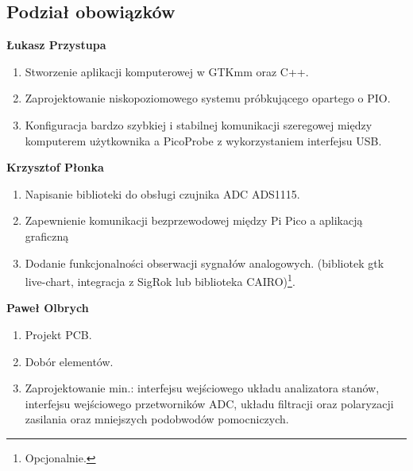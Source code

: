 \subsection{Podział obowiązków}
    \textbf{Łukasz Przystupa}
    \begin{enumerate}
        \item Stworzenie aplikacji komputerowej w GTKmm oraz C++.
        \item Zaprojektowanie niskopoziomowego systemu próbkującego opartego o PIO.
        \item Konfiguracja bardzo szybkiej i stabilnej komunikacji szeregowej między
        komputerem użytkownika a PicoProbe z wykorzystaniem interfejsu USB.
    \end{enumerate}

    \textbf{Krzysztof Płonka}
    \begin{enumerate}
        \item Napisanie biblioteki do obsługi czujnika ADC ADS1115.
        \item Zapewnienie komunikacji bezprzewodowej między Pi Pico a aplikacją graficzną
        \item Dodanie funkcjonalności obserwacji sygnałów analogowych.
        (bibliotek gtk live-chart, integracja z SigRok lub biblioteka CAIRO)\footnote{Opcjonalnie.}.\\ 
    \end{enumerate}

    \textbf{Paweł Olbrych}
    \begin{enumerate}
        \item Projekt PCB.
        \item Dobór elementów.
        \item Zaprojektowanie min.: interfejsu wejściowego układu analizatora stanów,
        interfejsu wejściowego przetworników ADC, układu filtracji oraz polaryzacji zasilania oraz
        mniejszych podobwodów pomocniczych. 
    \end{enumerate}
    